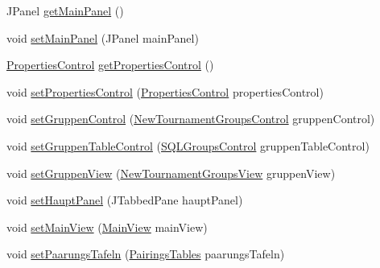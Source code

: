 \begin{DoxyCompactItemize}
\item 
J\+Panel \hyperlink{classde_1_1turnierverwaltung_1_1control_1_1_main_control_ac25ea0301b62134848af8c0b933bf214}{get\+Main\+Panel} ()
\item 
void \hyperlink{classde_1_1turnierverwaltung_1_1control_1_1_main_control_a6f72bfafc97e206231a1ffd0bff6a23c}{set\+Main\+Panel} (J\+Panel main\+Panel)
\item 
\hyperlink{classde_1_1turnierverwaltung_1_1control_1_1_properties_control}{Properties\+Control} \hyperlink{classde_1_1turnierverwaltung_1_1control_1_1_main_control_af5e09a46327fa3128db2571bba4caacd}{get\+Properties\+Control} ()
\item 
void \hyperlink{classde_1_1turnierverwaltung_1_1control_1_1_main_control_a01ff3b165d74d21475e894ff94067190}{set\+Properties\+Control} (\hyperlink{classde_1_1turnierverwaltung_1_1control_1_1_properties_control}{Properties\+Control} properties\+Control)
\item 
void \hyperlink{classde_1_1turnierverwaltung_1_1control_1_1_main_control_a58e4c1da4d9cef153f09490ad4c0baff}{set\+Gruppen\+Control} (\hyperlink{classde_1_1turnierverwaltung_1_1control_1_1_new_tournament_groups_control}{New\+Tournament\+Groups\+Control} gruppen\+Control)
\item 
void \hyperlink{classde_1_1turnierverwaltung_1_1control_1_1_main_control_a44f03fb9ab7f3483b38bc24311f5b73c}{set\+Gruppen\+Table\+Control} (\hyperlink{classde_1_1turnierverwaltung_1_1control_1_1_s_q_l_groups_control}{S\+Q\+L\+Groups\+Control} gruppen\+Table\+Control)
\item 
void \hyperlink{classde_1_1turnierverwaltung_1_1control_1_1_main_control_a8ab50a79e45e99f6951029cf04e68239}{set\+Gruppen\+View} (\hyperlink{classde_1_1turnierverwaltung_1_1view_1_1_new_tournament_groups_view}{New\+Tournament\+Groups\+View} gruppen\+View)
\item 
void \hyperlink{classde_1_1turnierverwaltung_1_1control_1_1_main_control_acbcefbbe37c618583159bd4c50c20cbf}{set\+Haupt\+Panel} (J\+Tabbed\+Pane haupt\+Panel)
\item 
void \hyperlink{classde_1_1turnierverwaltung_1_1control_1_1_main_control_aa3ca9bbe74b414e67316390809859f2d}{set\+Main\+View} (\hyperlink{classde_1_1turnierverwaltung_1_1view_1_1_main_view}{Main\+View} main\+View)
\item 
void \hyperlink{classde_1_1turnierverwaltung_1_1control_1_1_main_control_aad1aa2383cde7bbfd99555a66a5dcf11}{set\+Paarungs\+Tafeln} (\hyperlink{classde_1_1turnierverwaltung_1_1model_1_1_pairings_tables}{Pairings\+Tables} paarungs\+Tafeln)

\end{DoxyCompactItemize}
